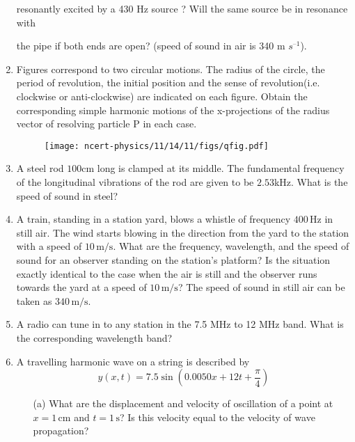 \begin{enumerate}[label=\thesection.\arabic*,ref=\thesection.\theenumi]
resonantly excited by a 430 Hz source ? Will the same source be in resonance with

the pipe if both ends are open? (speed of sound in air is 340 m $s^{–1}$).\\
\solution
\pagebreak

\item Figures correspond to two circular motions. The radius of the circle, the period of revolution, the initial position and the sense of revolution(i.e. clockwise or anti-clockwise) are indicated on each figure. Obtain the corresponding simple harmonic motions of the x-projections of the radius vector of resolving particle P in each case.

\begin{figure}[H]
    \centering
    \texttt{[image: ncert-physics/11/14/11/figs/qfig.pdf]}
\end{figure}
\solution

\pagebreak

\item A steel rod $100$cm long is clamped at its middle. The fundamental frequency of the longitudinal vibrations of the rod are given to be $2.53$kHz. What is the speed of sound in steel? \\
\solution
\pagebreak

\item A train, standing in a station yard, blows a whistle of frequency $400 \, \text{Hz}$ in still air. The wind starts blowing in the direction from the yard to the station with a speed of $10 \, \text{m/s}$. What are the frequency, wavelength, and the speed of sound for an observer standing on the station's platform? Is the situation exactly identical to the case when the air is still and the observer runs towards the yard at a speed of $10\, \text{m/s}$? The speed of sound in still air can be taken as $340\, \text{m/s}$.\\
\solution
\pagebreak

\item A radio can tune in to any station in the 7.5 MHz to 12 MHz band. What is the corresponding wavelength band?\\
\solution
\pagebreak

\item A travelling harmonic wave on a string is described by $$ y(x,t) = 7.5 \sin(0.0050x + 12t + \frac{\pi}{4}) $$
\begin{enumerate}
    \item[(a)] What are the displacement and velocity of oscillation of a point at $x = 1\,\text{cm}$ and $t = 1\,\text{s}$? Is this velocity equal to the velocity of wave propagation?
    

\end{enumerate}
\end{enumerate}

